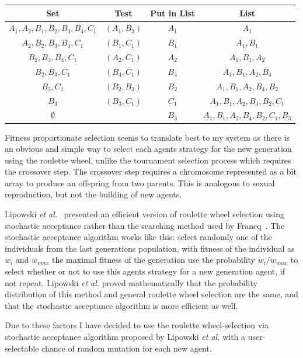 \documentclass[]{final_report}
\begin{document}
\begin{framed}
	\begin{center}
		\begin{tabular}{c|c|c|c}
		Set & Test & Put in List & List\\
		\hline
		${A_1, A_2, B_1, B_2, B_3, B_4, C_1}$ & $(A_1, B_3)$ & $A_1$ & ${A_1}$ \\
		${A_2, B_2, B_3, B_4, C_1}$ & $(B_1, C_1)$ & $B_1$ & ${A_1, B_1}$\\
		${B_2, B_3, B_4, C_1}$ & $(A_2, C_1)$ & $A_2$ & ${A_1, B_1, A_2}$\\
		${B_2, B_3, C_1}$ & $(B_4, C_1)$ & $B_4$ & ${A_1, B_1, A_2, B_4}$\\
		${B_3, C_1}$ & $(B_2, B_3)$ & $B_2$ & ${A_1, B_1, A_2, B_4, B_2}$\\
		${B_3}$ & $(B_3, C_1)$ & $C_1$ & ${A_1, B_1, A_2, B_4, B_2, C_1}$\\
		$\emptyset$	& & $B_3$ & ${A_1, B_1, A_2, B_4, B_2, C_1, B_3}$
		\end{tabular}
		\label{tab:tournament_selection}
	\end{center}	
\end{framed}
Fitness proportionate selection seems to translate best to my system as there is an obvious and simple way to select each agents strategy for the new generation using the roulette wheel, unlike the tournament selection process which requires the crossover step. The crossover step requires a chromosome represented as a bit array to produce an offspring from two parents. This is analogous to sexual reproduction, but not the building of new agents.\par
Lipowski \textit{et al.}~\cite{lipowski2012roulette} presented an efficient version of roulette wheel selection using stochastic acceptance rather than the searching method used by Francq~\cite{genetic_algorithms}. The stochastic acceptance algorithm works like this: select randomly one of the individuals from the last generations population, with fitness of the individual as $w_i$ and $w_{max}$ the maximal fitness of the generation use the probability $w_i / w_{max}$ to select whether or not to use this agents strategy for a new generation agent, if not repeat. Lipowski \textit{et al.} proved mathematically that the probability distribution of this method and general roulette wheel selection are the same, and that the stochastic acceptance algorithm is more efficient as well.\par
Due to these factors I have decided to use the roulette wheel-selection via stochastic acceptance algorithm proposed by Lipowski \textit{et al.} with a user-selectable chance of random mutation for each new agent.
\end{document}

